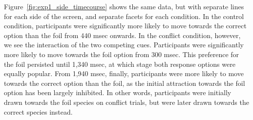 Figure~\ref{fig:exp1_side_timecourse} shows
the same data, but with separate lines for each side of the screen,
and separate facets for each condition.
In the control condition, participants were significantly more likely
to move towards the correct option than the foil
from 440 msec onwards.
In the conflict condition, however, we see the interaction of
the two competing cues.
Participants were significantly more likely to move towards
the foil option from 300 msec.
This preference for the foil persisted until 1,340 msec,
at which stage both response options were equally popular.
From 1,940 msec, finally, participants were more likely to
move towards the correct option than the foil,
as the initial attraction towards the foil option
has been largely inhibited.
In other words, participants were
initially drawn towards the foil species on conflict trials,
but were later drawn towards the correct species instead.

\FloatBarrier


